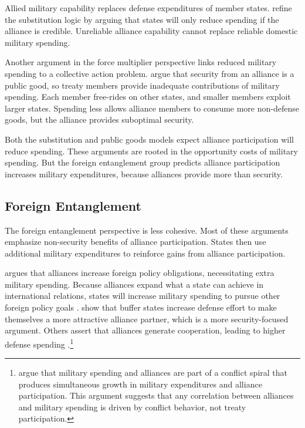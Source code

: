 \documentclass[12pt]{article}
\begin{document}
Allied military capability replaces defense expenditures of member states. 
\citet{DigiuseppePoast2016} refine the substitution logic by arguing that states will only reduce spending if the alliance is credible. 
Unreliable alliance capability cannot replace reliable domestic military spending. 


Another argument in the force multiplier perspective links reduced military spending to a collective action problem. 
\citet{OlsonZeckhauser1966} argue that security from an alliance is a public good, so treaty members provide inadequate contributions of military spending. 
Each member free-rides on other states, and smaller members exploit larger states. 
Spending less allows alliance members to consume more non-defense goods, but the alliance provides suboptimal security. 


Both the substitution and public goods models expect alliance participation will reduce spending. 
These arguments are rooted in the opportunity costs of military spending. 
But the foreign entanglement group predicts alliance participation increases military expenditures, because alliances provide more than security. 


\subsection{Foreign Entanglement}


The foreign entanglement perspective is less cohesive.
Most of these arguments emphasize non-security benefits of alliance participation. 
States then use additional military expenditures to reinforce gains from alliance participation. 


\citet{Diehl1994} argues that alliances increase foreign policy obligations, necessitating extra military spending. 
Because alliances expand what a state can achieve in international relations, states will increase military spending to pursue other foreign policy goals \citep{MorganPalmer2006}. 
\citet{Horowitzetal2017} show that buffer states increase defense effort to make themselves a more attractive alliance partner, which is a more security-focused argument. 
Others assert that alliances generate cooperation, leading to higher defense spending \citep{Palmer1990, QuirozFlores2011}.\footnote{
\citet{SeneseVasquez2008} argue that military spending and alliances are part of a conflict spiral that produces simultaneous growth in military expenditures and alliance participation. 
This argument suggests that any correlation between alliances and military spending is driven by conflict behavior, not treaty participation. 
}
\end{document}
